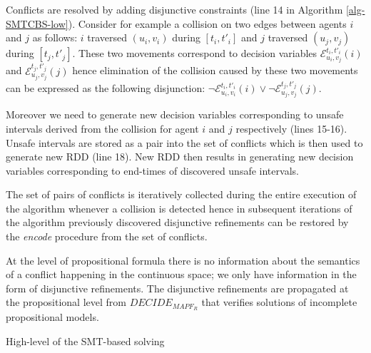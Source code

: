 Conflicts are resolved by adding disjunctive constraints (line 14 in Algorithm \ref{alg-SMTCBS-low}). Consider for example a collision on two edges between agents $i$ and $j$ as follows: $i$ traversed $(u_i,v_i)$ during $[t_i,t'_i]$ and $j$ traversed $(u_j,v_j)$ during $[t_j,t'_j]$. These two movements correspond to decision variables $\mathcal{E}_{u_i,v_j}^{t_i,t'_i}(i)$ and $\mathcal{E}_{u_j,v_j}^{t_j,t'_j}(j)$ hence elimination of the collision caused by these two movements can be expressed as the following disjunction: $\neg \mathcal{E}_{u_i,v_i}^{t_i,t'_i}(i) \vee \neg \mathcal{E}_{u_j,v_j}^{t_j,t'_j}(j)$.

Moreover we need to generate new decision variables corresponding to unsafe intervals derived from the collision for agent $i$ and $j$ respectively (lines 15-16). Unsafe intervals are stored as a pair into the set of conflicts which is then used to generate new RDD (line 18). New RDD then results in generating new decision variables corresponding to end-times of discovered unsafe intervals. 

The set of pairs of conflicts is iteratively collected during the entire execution of the algorithm whenever a collision is detected hence in subsequent iterations of the algorithm previously discovered disjunctive refinements can be restored by the {\em encode} procedure from the set of conflicts.

At the level of propositional formula there is no information about the semantics of a conflict happening in the continuous space; we only have information in the form of disjunctive refinements. The disjunctive refinements are propagated at the propositional level from $\mathit{DECIDE}_{\mathit{MAPF}_R}$ that verifies solutions of incomplete propositional models.

\begin{algorithm}[h]
\begin{footnotesize}
 
 \caption{High-level of the SMT-based \mapfr solving} \label{alg-SMTCBS-high}
\end{footnotesize}
\end{algorithm}


